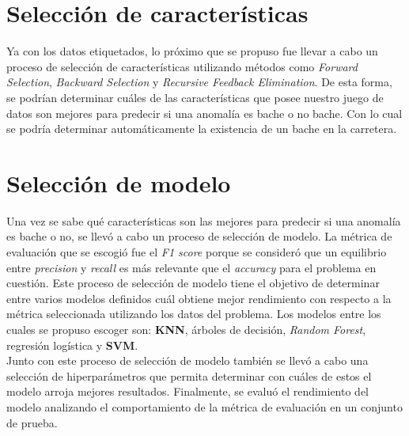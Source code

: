 \section{Selección de características}
	Ya con los datos etiquetados, lo próximo que se propuso fue llevar a cabo un proceso de selección de características utilizando métodos como
	\emph{Forward Selection}, \emph{Backward Selection} y \emph{Recursive Feedback Elimination}. De esta forma, se podrían determinar cuáles de las 
	características que posee nuestro juego de datos son mejores para predecir si una anomalía es bache o no bache. Con lo cual se podría determinar
	automáticamente la existencia de un bache en la carretera.

\section{Selección de modelo}
	Una vez se sabe qué características son las mejores para predecir si una anomalía es bache o no, se llevó a cabo un proceso de selección de
	modelo. La métrica de evaluación que se escogió fue el \emph{F1 score} porque se consideró que un equilibrio entre \emph{precision} y
	\emph{recall} es más relevante que el \emph{accuracy} para el problema en cuestión. Este proceso de selección de modelo tiene el
	objetivo de determinar entre varios modelos definidos cuál obtiene mejor rendimiento con respecto a la métrica seleccionada utilizando los datos
	del problema. Los modelos entre los cuales se propuso escoger son: \textbf{KNN}, árboles de decisión, \emph{Random Forest}, regresión logística y
	\textbf{SVM}.\\
	\indent Junto con este proceso de selección de modelo también se llevó a cabo una selección de hiperparámetros que permita determinar con
	cuáles de estos el modelo arroja mejores resultados. Finalmente, se evaluó el rendimiento del modelo analizando el comportamiento de la métrica
	de evaluación en un conjunto de prueba.
